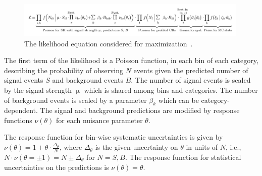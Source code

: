 


%

\begin{figure}[tp]
  \centering
  \includegraphics[width=0.99\textwidth]{figures/likelihood/equation}
  \caption{The likelihood equation considered for maximization~\cite{HIGG-2013-13}.}
  \label{fig:results-likelihood-eqn}
\end{figure}

The first term of the likelihood is a Poisson function, in each bin of each category, describing the probability of observing $N$ events given the predicted number of signal events $S$ and background events $B$. The number of signal events is scaled by the signal strength $\upmu$ which is shared among bins and categories. The number of background events is scaled by a parameter $\beta_k$ which can be category-dependent. The signal and background predictions are modified by response functions $\nu(\theta)$ for each nuisance parameter $\theta$. 

The response function for bin-wise systematic uncertainties is given by $\nu(\theta) = 1 + \theta\cdot\frac{\Delta_\theta}{N}$, where $\Delta_\theta$ is the given uncertainty on $\theta$ in units of $N$, i.e., $N\cdot\nu(\theta = \pm 1) = N \pm \Delta_\theta$ for $N=S,B$. The response function for statistical uncertainties on the predictions is $\nu(\theta) = \theta$.

